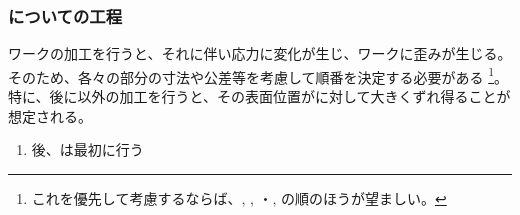 \subsubsection{\DimpleMilling についての工程}
ワークの加工を行うと、それに伴い応力に変化が生じ、ワークに歪みが生じる。
そのため、各々の部分の寸法や公差等を考慮して順番を決定する必要がある
\footnote{これを優先して考慮するならば、\EndFacecutMilling, \OutcutMilling, \EndFaceOutCChamferMilling・\EndFaceInCChamferMilling, \KeywayMilling の順のほうが望ましい。}。
特に、\DimpleMeasurement 後に\Dimple 以外の加工を行うと、その表面位置が\DimpleDepth に対して大きくずれ得ることが想定される。
\begin{enumerate}[label={\sarrow}]
\item \DimpleMeasurement 後、\DimpleMilling は最初に行う
\end{enumerate}



